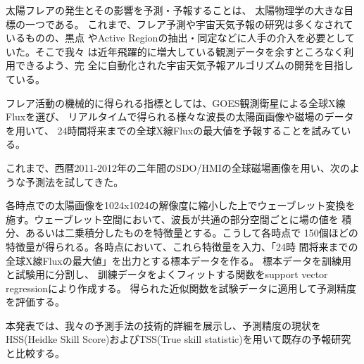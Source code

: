 \documentclass{2014a}
\begin{document}

太陽フレアの発生とその影響を予測・予報することは、
太陽物理学の大きな目標の一つである。
これまで、フレア予測や宇宙天気予報の研究は多くなされているものの、黒点
やActive Regionの抽出・同定などに人手の介入を必要としていた。そこで我々
は近年飛躍的に増大している観測データを余すところなく利用できるよう、完
全に自動化された宇宙天気予報アルゴリズムの開発を目指している。

フレア活動の機械的に得られる指標としては、GOES観測衛星による全球X線Fluxを選び、
リアルタイムで得られる様々な波長の太陽面画像や磁場のデータを用いて、
24時間将来までの全球X線Fluxの最大値を予報することを試みている。

これまで、西暦2011-2012年の二年間のSDO/HMIの全球磁場画像を用い、次のような予測法を試してきた。

各時点での太陽画像を1024x1024の解像度に縮小した上でウェーブレット変換を
施す。ウェーブレット空間において、波長が共通の部分空間ごとに場の値を
積分、あるいは二乗積分したものを特徴量とする。こうして各時点で
150個ほどの特徴量が得られる。各時点において、これら特徴量を入力、「24時
  間将来までの全球X線Fluxの最大値」を出力とする標本データを作る。
標本データを訓練用と試験用に分割し、
訓練データをよくフィットする関数をsupport vector regressionにより作成する。
得られた近似関数を試験データに適用して予測精度を評価する。

本発表では、我々の予測手法の技術的詳細を展示し、予測精度の現状をHSS(Heidke Skill Score)およびTSS(True skill statistic)を用いて既存の予報研究と比較する。


\end{document}

